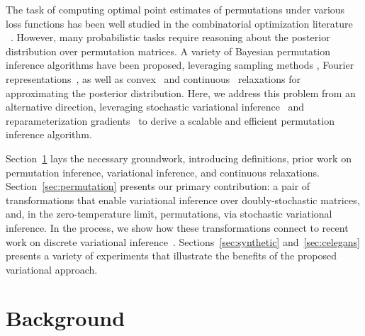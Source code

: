 \documentclass[twoside]{article}
\begin{document}
The task of computing optimal point estimates of permutations under
various loss functions has been well studied in the combinatorial
optimization literature ~\citep{kuhn1955hungarian,
  munkres1957algorithms, lawler1963quadratic}. However, many
probabilistic tasks require reasoning about the posterior distribution over
permutation matrices.  A variety of Bayesian permutation inference
algorithms have been proposed, leveraging sampling methods
\citep{diaconis1988group, miller2013exact, harrison2013importance},
Fourier representations~\citep{kondor2007multi, huang2009fourier}, as
well as convex~\citep{lim2014beyond} and
continuous~\citep{plis2011directional} relaxations for approximating
the posterior distribution.  Here, we address this problem from an
alternative direction, leveraging stochastic variational
inference~\citep{hoffman2013stochastic} and reparameterization
gradients~\citep{rezende2014stochastic, Kingma2014} to derive a
scalable and efficient permutation inference algorithm.

Section~\ref{sec:background} lays the necessary groundwork,
introducing definitions, prior work on permutation inference,
variational inference, and continuous relaxations.
Section~\ref{sec:permutation} presents our primary contribution: a
pair of transformations that enable variational inference over
doubly-stochastic matrices, and, in the zero-temperature limit,
permutations, via stochastic variational inference.  In the process,
we show how these transformations connect to recent work on discrete
variational inference~\citep{maddison2016concrete,
  jang2016categorical, balog2017lost}.  Sections~\ref{sec:synthetic}
and~\ref{sec:celegans} presents a variety of experiments that
illustrate the benefits of the proposed variational approach.
  
\section{Background}
\label{sec:background}

\end{document}
